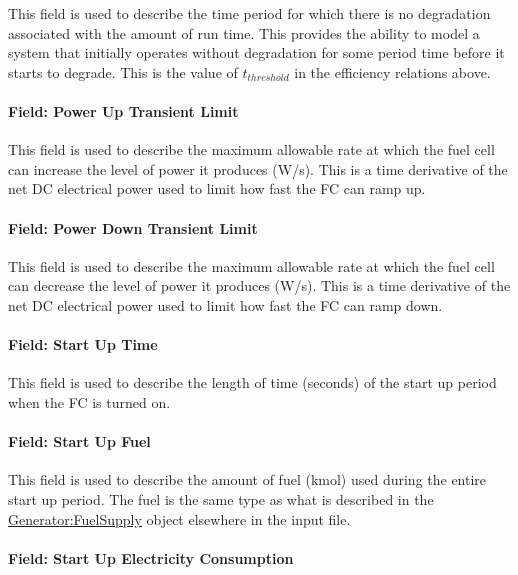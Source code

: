 This field is used to describe the time period for which there is no degradation associated with the amount of run time. This provides the ability to model a system that initially operates without degradation for some period time before it starts to degrade. This is the value of \({t_{threshold}}\) in the efficiency relations above.

\paragraph{Field: Power Up Transient Limit}\label{field-power-up-transient-limit}

This field is used to describe the maximum allowable rate at which the fuel cell can increase the level of power it produces (W/s). This is a time derivative of the net DC electrical power used to limit how fast the FC can ramp up.

\paragraph{Field: Power Down Transient Limit}\label{field-power-down-transient-limit}

This field is used to describe the maximum allowable rate at which the fuel cell can decrease the level of power it produces (W/s). This is a time derivative of the net DC electrical power used to limit how fast the FC can ramp down.

\paragraph{Field: Start Up Time}\label{field-start-up-time}

This field is used to describe the length of time (seconds) of the start up period when the FC is turned on.

\paragraph{Field: Start Up Fuel}\label{field-start-up-fuel}

This field is used to describe the amount of fuel (kmol) used during the entire start up period. The fuel is the same type as what is described in the \hyperref[generatorfuelsupply]{Generator:FuelSupply} object elsewhere in the input file.

\paragraph{Field: Start Up Electricity Consumption}\label{field-start-up-electricity-consumption}

